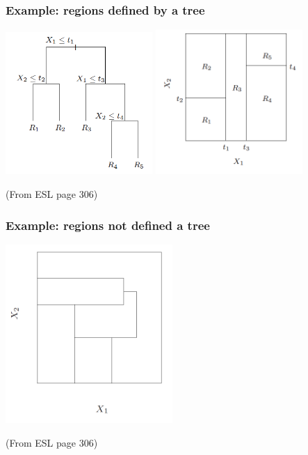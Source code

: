 \documentclass[mathserif]{beamer}
\begin{document}
\begin{frame}
\frametitle{Example: regions defined by a tree}
\bigskip
\includegraphics[width=2.2in]{ex1-tree.png}
\includegraphics[width=2.2in]{ex1-regions.png}

\bigskip
(From ESL page 306)
\end{frame}

\begin{frame}
\frametitle{Example: regions not defined a tree}
\begin{center}
\bigskip
\includegraphics[width=2.5in]{ex1-notpos.png}
\end{center}
\vspace{-5pt}
(From ESL page 306)
\end{frame}
\end{document}
